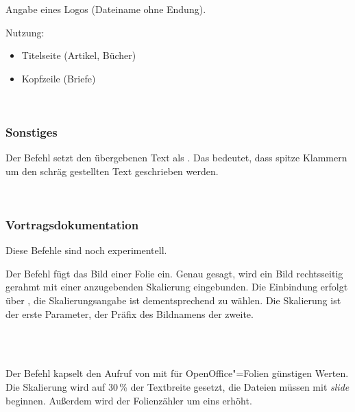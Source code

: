 \DescribeMacro{\logo}
Angabe eines Logos (Dateiname ohne Endung).

Nutzung:
\begin{itemize}
	\item Titelseite (Artikel, Bücher)
	\item Kopfzeile (Briefe)
\end{itemize}

\begin{nutzung}
		\>\\
	\beispiel
		\>
\end{nutzung}


\subsubsection{Sonstiges}

\DescribeMacro{\meta}
Der Befehl  setzt den übergebenen Text als .
Das bedeutet, dass spitze Klammern um den schräg gestellten Text geschrieben werden.
\begin{nutzung}
		\>\\
	\beispiel
		\>
\end{nutzung}

\subsubsection{Vortragsdokumentation}

Diese Befehle sind noch experimentell.

\DescribeMacro{\insertslide}
Der Befehl  fügt das Bild einer Folie ein.
Genau gesagt, wird ein Bild rechtsseitig gerahmt mit einer anzugebenden Skalierung eingebunden.
Die Einbindung erfolgt über , die Skalierungsangabe ist dementsprechend zu wählen.
Die Skalierung ist der erste Parameter, der Präfix des Bildnamens der zweite.

\begin{nutzung}
		\>\\
	\beispiel
		\>\\
		\>
\end{nutzung}

\DescribeMacro{\nextslide}
Der Befehl  kapselt den Aufruf von  mit für OpenOffice"=Folien günstigen Werten.
Die Skalierung wird auf 30\,\% der Textbreite gesetzt, die Dateien müssen mit \emph{slide} beginnen.
Außerdem wird der Folienzähler um eins erhöht.

